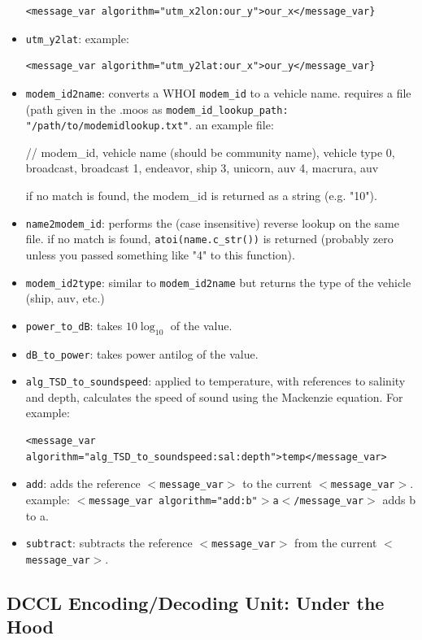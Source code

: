 \documentclass[11pt, letterpaper, oneside]{memoir}
\newcommand{\xmltag}[1]{\texttt{$<$#1$>$}}
\begin{document}
\begin{itemize}
\begin{verbatim}<message_var algorithm="utm_x2lon:our_y">our_x</message_var}\end{verbatim}
\item \verb|utm_y2lat|: example: 
\begin{verbatim}
<message_var algorithm="utm_y2lat:our_x">our_y</message_var}
\end{verbatim}
\item \verb|modem_id2name|: converts a WHOI \verb|modem_id| to a vehicle name. requires a file (path given in the .moos as \verb|modem_id_lookup_path: "/path/to/modemidlookup.txt"|. an example file:
\begin{boxedverbatim}
// modem_id, vehicle name (should be community name), vehicle type
0, broadcast, broadcast
1, endeavor, ship
3, unicorn, auv
4, macrura, auv
\end{boxedverbatim}
\resetbvlinenumber
if no match is found, the modem\_id is returned as a string (e.g. "10").
\item \verb|name2modem_id|: performs the (case insensitive) reverse lookup on the same file. if no match is found, \verb|atoi(name.c_str())| is returned (probably zero unless you passed something like "4" to this function).
\item \verb|modem_id2type|: similar to \verb|modem_id2name| but returns the type of the vehicle (ship, auv, etc.)
\item \verb|power_to_dB|: takes $10\log_{10}$ of the value.
\item \verb|dB_to_power|: takes power antilog of the value.
\item \verb|alg_TSD_to_soundspeed|: applied to temperature, with references to salinity and depth, calculates the speed of sound using the Mackenzie equation. For example:
\begin{verbatim}<message_var algorithm="alg_TSD_to_soundspeed:sal:depth">temp</message_var>\end{verbatim}
\item \verb|add|: adds the reference \xmltag{message\_var} to the current \xmltag{message\_var}. example: \xmltag{message\_var algorithm="add:b"$>$a$<$/message\_var} adds b to a.
\item \verb|subtract|: subtracts the reference \xmltag{message\_var} from the current \xmltag{message\_var}.
\end{itemize}

\subsection{DCCL Encoding/Decoding Unit: Under the Hood}
\end{document}
